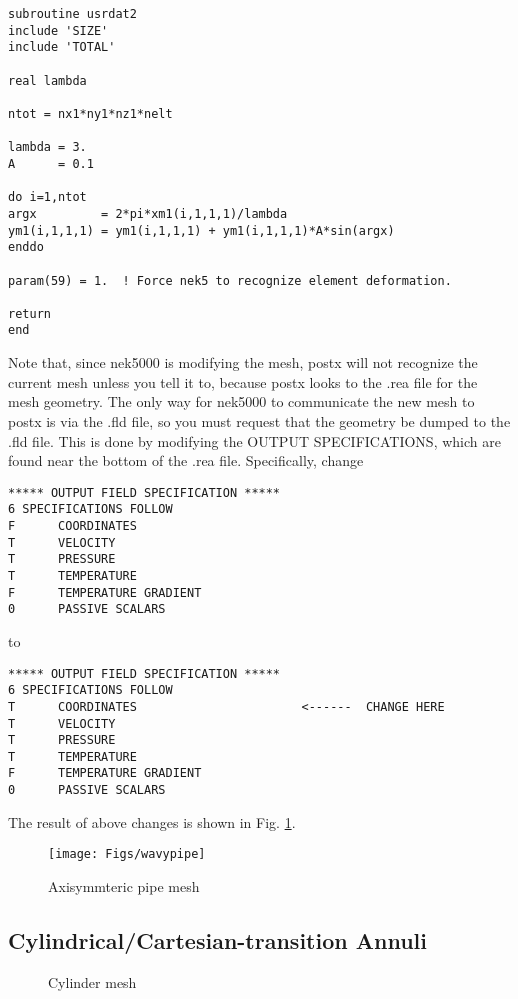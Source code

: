 \begin{verbatim}
subroutine usrdat2
include 'SIZE'
include 'TOTAL'

real lambda

ntot = nx1*ny1*nz1*nelt

lambda = 3.
A      = 0.1

do i=1,ntot
argx         = 2*pi*xm1(i,1,1,1)/lambda
ym1(i,1,1,1) = ym1(i,1,1,1) + ym1(i,1,1,1)*A*sin(argx)
enddo

param(59) = 1.  ! Force nek5 to recognize element deformation.

return
end
\end{verbatim}
\noindent
Note that, since nek5000 is modifying the mesh, postx will not
recognize the current mesh unless you tell it to, because postx
looks to the .rea file for the mesh geometry.  The only way for
nek5000 to communicate the new mesh to postx is via the .fld
file, so you must request that the geometry be dumped to the
.fld file.   This is done by modifying the OUTPUT SPECIFICATIONS,
which are found near the bottom of the .rea file.  Specifically,
change

\begin{verbatim}
***** OUTPUT FIELD SPECIFICATION *****
6 SPECIFICATIONS FOLLOW
F      COORDINATES
T      VELOCITY
T      PRESSURE
T      TEMPERATURE
F      TEMPERATURE GRADIENT
0      PASSIVE SCALARS
\end{verbatim} 

\noindent
to

\begin{verbatim}
***** OUTPUT FIELD SPECIFICATION *****
6 SPECIFICATIONS FOLLOW
T      COORDINATES                       <------  CHANGE HERE
T      VELOCITY
T      PRESSURE
T      TEMPERATURE
F      TEMPERATURE GRADIENT
0      PASSIVE SCALARS
\end{verbatim} 

\noindent
The result of above changes is shown in Fig. \ref{fig:wavypipe}.
\begin{figure}
  \centering
  \texttt{[image: Figs/wavypipe]}
  \caption{Axisymmteric pipe mesh}
  \label{fig:wavypipe}
\end{figure}

\subsection{Cylindrical/Cartesian-transition Annuli}
\begin{figure}
  \centering
  \quad\quad\quad
  \caption{Cylinder mesh}
\end{figure}



